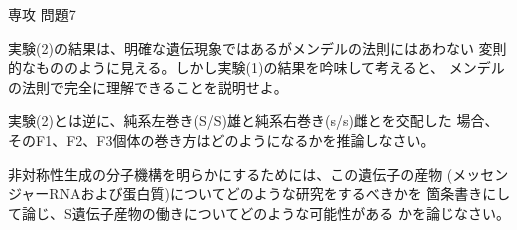 \documentclass[fleqn]{jbook}
\begin{document}
\begin{question}{専攻 問題7}{}
\begin{subquestions}
\SubQuestion
  実験(2)の結果は、明確な遺伝現象ではあるがメンデルの法則にはあわない
  変則的なもののように見える。しかし実験(1)の結果を吟味して考えると、
  メンデルの法則で完全に理解できることを説明せよ。

\SubQuestion
  実験(2)とは逆に、純系左巻き(S/S)雄と純系右巻き(s/s)雌とを交配した
  場合、そのF1、F2、F3個体の巻き方はどのようになるかを推論しなさい。

\SubQuestion
  非対称性生成の分子機構を明らかにするためには、この遺伝子の産物
  (メッセンジャーRNAおよび蛋白質)についてどのような研究をするべきかを
  箇条書きにして論じ、S遺伝子産物の働きについてどのような可能性がある
  かを論じなさい。

\end{subquestions}
\end{question}
\end{document}
